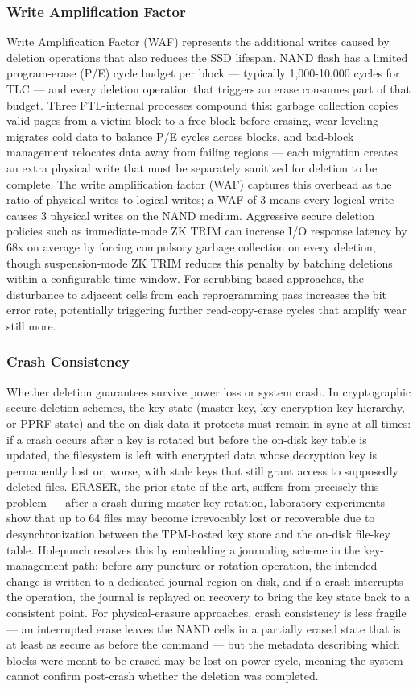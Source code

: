 \subsubsection{Write Amplification Factor}
Write Amplification Factor (WAF) represents the additional writes caused by deletion operations that 
also reduces the SSD lifespan. NAND flash has a limited program-erase (P/E) cycle budget per block — 
typically 1,000-10,000 cycles for TLC — and every deletion operation that triggers an erase consumes 
part of that budget. Three FTL-internal processes compound this: garbage collection copies valid pages 
from a victim block to a free block before erasing, wear leveling migrates cold data to balance P/E 
cycles across blocks, and bad-block management relocates data away from failing regions — each migration 
creates an extra physical write that must be separately sanitized for deletion to be complete. The write 
amplification factor (WAF) captures this overhead as the ratio of physical writes to logical writes; a 
WAF of 3 means every logical write causes 3 physical writes on the NAND medium. Aggressive secure 
deletion policies such as immediate-mode ZK TRIM can increase I/O response latency by 68x on average by 
forcing compulsory garbage collection on every deletion, though suspension-mode ZK TRIM reduces this 
penalty by batching deletions within a configurable time window. For scrubbing-based approaches, the 
disturbance to adjacent cells from each reprogramming pass increases the bit error rate, potentially 
triggering further read-copy-erase cycles that amplify wear still more.

\subsubsection{Crash Consistency}
Whether deletion guarantees survive power loss or system crash. In cryptographic secure-deletion schemes, 
the key state (master key, key-encryption-key hierarchy, or PPRF state) and the on-disk data it protects 
must remain in sync at all times: if a crash occurs after a key is rotated but before the on-disk key 
table is updated, the filesystem is left with encrypted data whose decryption key is permanently lost 
or, worse, with stale keys that still grant access to supposedly deleted files. ERASER, the prior 
state-of-the-art, suffers from precisely this problem — after a crash during master-key rotation, 
laboratory experiments show that up to 64 files may become irrevocably lost or recoverable due to 
desynchronization between the TPM-hosted key store and the on-disk file-key table. Holepunch resolves 
this by embedding a journaling scheme in the key-management path: before any puncture or rotation 
operation, the intended change is written to a dedicated journal region on disk, and if a crash 
interrupts the operation, the journal is replayed on recovery to bring the key state back to a 
consistent point. For physical-erasure approaches, crash consistency is less fragile — an interrupted 
erase leaves the NAND cells in a partially erased state that is at least as secure as before the command 
— but the metadata describing which blocks were meant to be erased may be lost on power cycle, meaning 
the system cannot confirm post-crash whether the deletion was completed.

